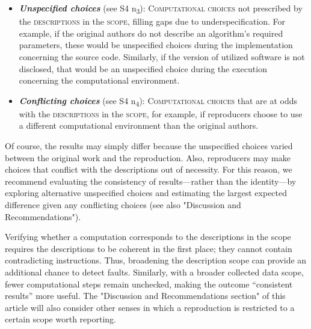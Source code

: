 \documentclass[authordate, meta]{jote-new-article}
\begin{document}
	\begin{itemize}[label=\phantom{\textbullet},topsep=0pt]
		\item \emph{\textbf{Unspecified choices}} (see S4 \rightarrow{ }n\textsubscript{3}): \textsc{Computational choices} not prescribed by the \textsc{descriptions} in the \textsc{scope}, filling gaps due to underspecification. For example, if the original authors do not describe an algorithm's required parameters, these would be unspecified choices during the implementation concerning the source code. Similarly, if the version of utilized software is not disclosed, that would be an unspecified choice during the execution concerning the computational environment.

		\item \emph{\textbf{Conflicting choices}} (see S4 \rightarrow{ }n\textsubscript{4}): \textsc{Computational choices} that are at odds with the \textsc{descriptions} in the \textsc{scope}, for example, if reproducers choose to use a different computational environment than the original authors.
	\end{itemize}
	\vspace{\topsep}




	Of course, the results may simply differ because the unspecified choices varied between the original work and the reproduction. Also, reproducers may make choices that conflict with the descriptions out of necessity. For this reason, we recommend evaluating the consistency of results—rather than the identity—by exploring alternative unspecified choices and estimating the largest expected difference given any conflicting choices (see also "Discussion and Recommendations").



	Verifying whether a computation corresponds to the descriptions in the scope requires the descriptions to be coherent in the first place; they cannot contain contradicting instructions. Thus, broadening the description scope can provide an additional chance to detect faults. Similarly, with a broader collected data scope, fewer computational steps remain unchecked, making the outcome “consistent results” more useful. The "Discussion and Recommendations section" of this article will also consider other senses in which a reproduction is restricted to a certain scope worth reporting.
\end{document}
